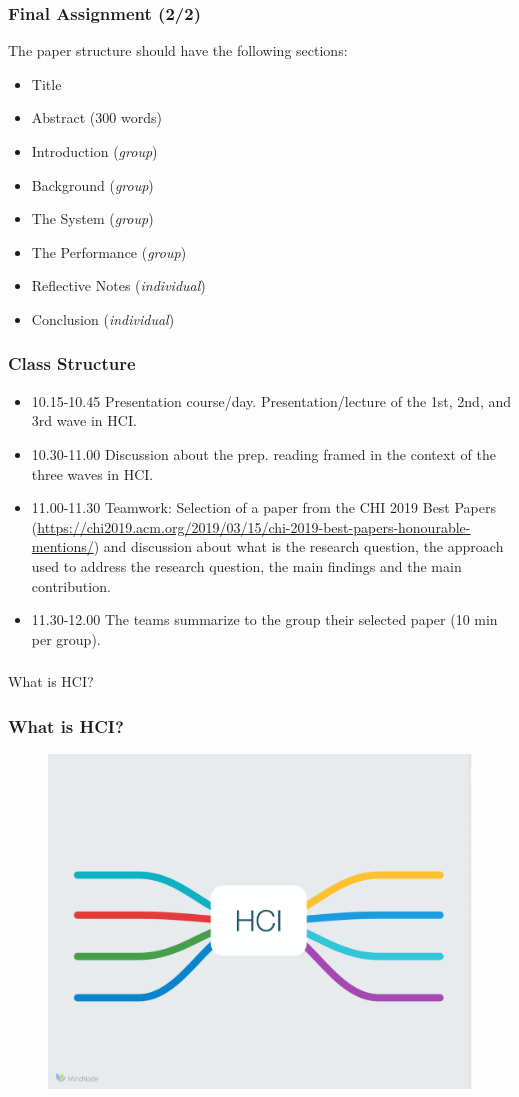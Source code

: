 \documentclass[screen, aspectratio=169]{beamer}
\begin{document}
%
\begin{frame}
\frametitle{Final Assignment (2/2)}
{\small
The paper structure should have the following sections:
\begin{itemize}
\item Title
\item Abstract (300 words)
\item Introduction (\emph{group})
\item Background (\emph{group})
\item The System (\emph{group})
\item The Performance (\emph{group})
\item Reflective Notes (\emph{individual})
\item Conclusion (\emph{individual})
\end{itemize}
}
\end{frame}
%
\begin{frame}
\frametitle{Class Structure}
\begin{itemize}
\item 10.15-10.45 Presentation course/day. Presentation/lecture of the 1st, 2nd, and 3rd wave in HCI.
\item 10.30-11.00 Discussion about the prep. reading framed in the context of the three waves in HCI.
\item 11.00-11.30 Teamwork: Selection of a paper from the CHI 2019 Best Papers (\url{https://chi2019.acm.org/2019/03/15/chi-2019-best-papers-honourable-mentions/}) and discussion about what is the research question, the approach used to address the research question, the main findings and the main contribution.
\item 11.30-12.00 The teams summarize to the group their selected paper (10 min per group).
\end{itemize}
\end{frame}
%
\begin{frame}
\frametitle{}
\Huge{What is HCI?}
\end{frame}
%
\begin{frame}
\frametitle{What is HCI?}
 \begin{figure}
	\includegraphics[scale=0.22]{img/HCI-empty-mindmap.png}
    \end{figure}	
\end{frame}
\end{document}
